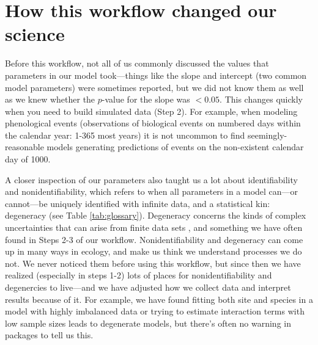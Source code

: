 \documentclass[11pt]{article}
\begin{document}
\section*{How this workflow changed our science} 
Before this workflow, not all of us commonly discussed the values that parameters in our model took---things like the slope and intercept (two common model parameters) were sometimes reported, but we did not know them as well as we knew whether the $p$-value for the slope was $<0.05$. This changes quickly when you need to build simulated data (Step 2). For example, when modeling phenological events (observations of biological events on numbered days within the calendar year: 1-365 most years) it is not uncommon to find seemingly-reasonable models generating predictions of events on the non-existent calendar day of 1000. %

A closer inspection of our parameters also taught us a lot about identifiability and nonidentifiability, which refers to when all parameters in a model can---or cannot---be uniquely identified with infinite data, and a statistical kin: degeneracy (see Table \ref{tab:glossary}).  Degeneracy concerns the kinds of complex uncertainties that can arise from finite data sets \citep{gelmanhill}, and something we have often found in Steps 2-3 of our workflow.
Nonidentifiability and degeneracy can come up in many ways in ecology, and make us think we understand processes we do not. We never noticed them before using this workflow, but since then we have realized (especially in steps 1-2) lots of places for nonidentifiability and degenercies to live---and we have adjusted how we collect data and interpret results because of it. For example, we have found fitting both site and species in a model with highly imbalanced data or trying to estimate interaction terms with low sample sizes \citep[][for more details]{regotherstories} leads to degenerate models, but there's often no warning in packages to tell us this. 
\end{document}

